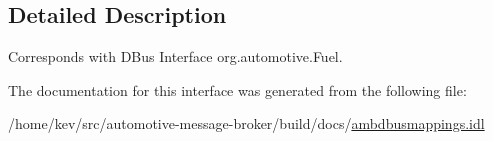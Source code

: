 \subsection{Detailed Description}
Corresponds with D\+Bus Interface org.\+automotive.\+Fuel. 

The documentation for this interface was generated from the following file\+:\begin{DoxyCompactItemize}
\item 
/home/kev/src/automotive-\/message-\/broker/build/docs/\hyperlink{ambdbusmappings_8idl}{ambdbusmappings.\+idl}\end{DoxyCompactItemize}
